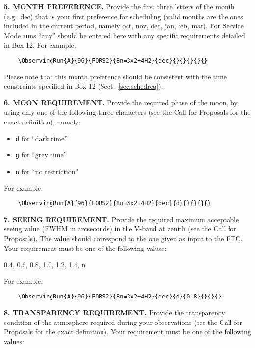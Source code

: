 \documentclass{article}
\begin{document}
\medskip

{\bf 5. MONTH PREFERENCE.} Provide the first three letters of the
month (e.g.\ dec) that is your first preference for
scheduling (valid months are the ones included in the current period,
namely oct, nov, dec, jan,
feb, mar).
For Service Mode runs ``any'' should be entered here with any specific 
requirements detailed in Box 12. 
For example,
\begin{verbatim}
    \ObservingRun{A}{96}{FORS2}{8n=3x2+4H2}{dec}{}{}{}{}{}
\end{verbatim}
Please note that this month preference should be consistent with the time
constraints specified in Box 12 (Sect.~\ref{sec:schedreq}).

\medskip

{\bf 6. MOON REQUIREMENT.} Provide the required phase of the moon, by
using only one of the following three characters (see the Call for
Proposals for the exact definition), namely:
\begin{itemize}
\item {\tt d} for ``dark time''
\item {\tt g} for ``grey time''
\item {\tt n} for ``no restriction''
\end{itemize}
For example,
\begin{verbatim}
    \ObservingRun{A}{96}{FORS2}{8n=3x2+4H2}{dec}{d}{}{}{}{}
\end{verbatim}

\medskip

{\bf 7. SEEING REQUIREMENT.} Provide the required maximum acceptable seeing value (FWHM in arcseconds) in the V-band at zenith (see the Call for Proposals). The value should correspond to the one given as input to the ETC.  Your requirement must be one of the following values:

\smallskip

0.4, 0.6, 0.8, 1.0, 1.2, 1.4, n

\smallskip

For example,
\begin{verbatim}
    \ObservingRun{A}{96}{FORS2}{8n=3x2+4H2}{dec}{d}{0.8}{}{}{}
\end{verbatim}

\medskip

{\bf 8. TRANSPARENCY REQUIREMENT.} Provide the transparency
condition of the atmosphere required during your observations (see the
Call for Proposals for the exact definition). Your requirement must
be one of the following values:
\end{document}
